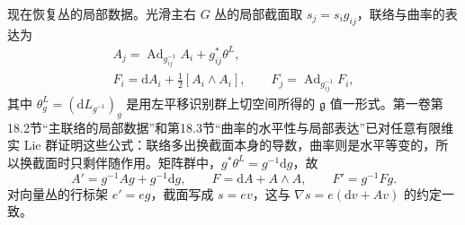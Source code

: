 \ProseParagraphBreak

现在恢复丛的局部数据。光滑主右 \(G\) 丛的局部截面取 \(s_j=s_i g_{ij}\)，联络与曲率的表达为
\begin{equation}\label{g2:eq:cw-local-connection-curvature}
	\begin{gathered}
		A_j=\operatorname{Ad}_{g_{ij}^{-1}}A_i+g_{ij}^*\theta^L,\\
		F_i=\mathrm dA_i+\frac12[A_i\wedge A_i],\qquad
		F_j=\operatorname{Ad}_{g_{ij}^{-1}}F_i,
	\end{gathered}
\end{equation}
其中 \(\theta^L_g=(\mathrm dL_{g^{-1}})_g\) 是用左平移识别群上切空间所得的 \(\mathfrak g\) 值一形式。第一卷第18.2节“主联络的局部数据”和第18.3节“曲率的水平性与局部表达”已对任意有限维实 Lie 群证明这些公式：联络多出换截面本身的导数，曲率则是水平等变的，所以换截面时只剩伴随作用。矩阵群中，\(g^*\theta^L=g^{-1}\mathrm dg\)，故
\[
	A'=g^{-1}Ag+g^{-1}\mathrm dg,\qquad
	F=\mathrm dA+A\wedge A,\qquad F'=g^{-1}Fg.
\]
对向量丛的行标架 \(e'=eg\)，截面写成 \(s=ev\)，这与 \(\nabla s=e(\mathrm dv+Av)\) 的约定一致。

